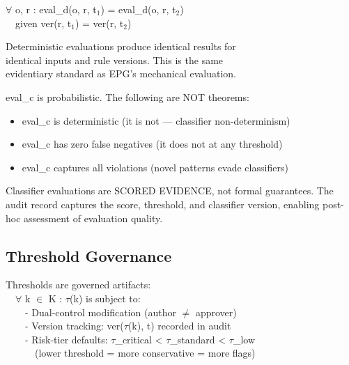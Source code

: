 \begin{cthm}
\begin{claddisp}
$\forall$ o, r : eval\_d(o, r, t$_1$) = eval\_d(o, r, t$_2$)\\
~~given ver(r, t$_1$) = ver(r, t$_2$)\\
\end{claddisp}
\begin{claddisp}
Deterministic evaluations produce identical results for\\
identical inputs and rule versions. This is the same\\
evidentiary standard as EPG's mechanical evaluation.\\
\end{claddisp}
\end{cthm}

\begin{cprp}
eval\_\allowbreak{}c is probabilistic. The following are NOT theorems:
\begin{itemize}
  \item eval\_\allowbreak{}c is deterministic (it is not --- classifier non-determinism)
  \item eval\_\allowbreak{}c has zero false negatives (it does not at any threshold)
  \item eval\_\allowbreak{}c captures all violations (novel patterns evade classifiers)
\end{itemize}

Classifier evaluations are SCORED EVIDENCE, not formal guarantees.
The audit record captures the score, threshold, and classifier version, enabling post-hoc assessment of evaluation quality.

\end{cprp}


\subsection{Threshold Governance}
\label{sec:formal-model-A-2-6}


\begin{claddisp}
Thresholds are governed artifacts:\\
~~$\forall$ k $\in$ K : $\tau$(k) is subject to:\\
~~~~- Dual-control modification (author $\neq$ approver)\\
~~~~- Version tracking: ver($\tau$(k), t) recorded in audit\\
~~~~- Risk-tier defaults: $\tau$\_critical < $\tau$\_standard < $\tau$\_low\\
~~~~~~(lower threshold = more conservative = more flags)
\end{claddisp}


